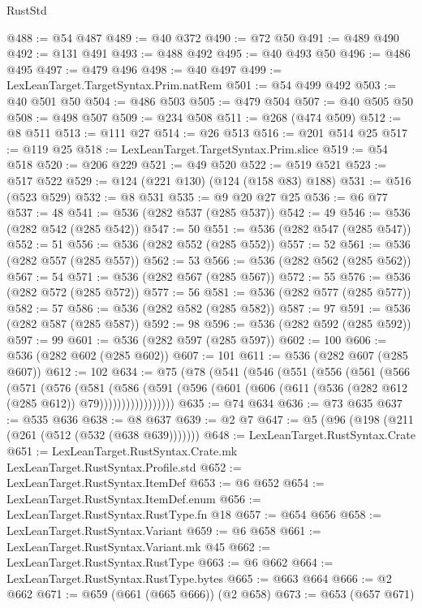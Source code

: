 \begin{lexlean}{RustStd}
\begin{coremodule}
@488 := @54 @487
@489 := @40 @372
@490 := @72 @50
@491 := @489 @490
@492 := @131 @491
@493 := @488 @492
@495 := @40 @493 @50
@496 := @486 @495
@497 := @479 @496
@498 := @40 @497
@499 := LexLeanTarget.TargetSyntax.Prim.natRem
@501 := @54 @499 @492
@503 := @40 @501 @50
@504 := @486 @503
@505 := @479 @504
@507 := @40 @505 @50
@508 := @498 @507
@509 := @234 @508
@511 := @268 (@474 @509)
@512 := @8 @511
@513 := @111 @27
@514 := @26 @513
@516 := @201 @514 @25
@517 := @119 @25
@518 := LexLeanTarget.TargetSyntax.Prim.slice
@519 := @54 @518
@520 := @206 @229
@521 := @49 @520
@522 := @519 @521
@523 := @517 @522
@529 := @124 (@221 @130) (@124 (@158 @83) @188)
@531 := @516 (@523 @529)
@532 := @8 @531
@535 := @9 @20 @27 @25
@536 := @6 @77
@537 := 48
@541 := @536 (@282 @537 (@285 @537))
@542 := 49
@546 := @536 (@282 @542 (@285 @542))
@547 := 50
@551 := @536 (@282 @547 (@285 @547))
@552 := 51
@556 := @536 (@282 @552 (@285 @552))
@557 := 52
@561 := @536 (@282 @557 (@285 @557))
@562 := 53
@566 := @536 (@282 @562 (@285 @562))
@567 := 54
@571 := @536 (@282 @567 (@285 @567))
@572 := 55
@576 := @536 (@282 @572 (@285 @572))
@577 := 56
@581 := @536 (@282 @577 (@285 @577))
@582 := 57
@586 := @536 (@282 @582 (@285 @582))
@587 := 97
@591 := @536 (@282 @587 (@285 @587))
@592 := 98
@596 := @536 (@282 @592 (@285 @592))
@597 := 99
@601 := @536 (@282 @597 (@285 @597))
@602 := 100
@606 := @536 (@282 @602 (@285 @602))
@607 := 101
@611 := @536 (@282 @607 (@285 @607))
@612 := 102
@634 := @75
    (@78
      (@541
        (@546
          (@551
            (@556
              (@561
                (@566
                  (@571
                    (@576
                      (@581
                        (@586
                          (@591
                            (@596
                              (@601 (@606 (@611 (@536 (@282 @612 (@285 @612)) @79)))))))))))))))))
@635 := @74 @634
@636 := @73 @635
@637 := @535 @636
@638 := @8 @637
@639 := @2 @7
@647 := @5 (@96 (@198 (@211 (@261 (@512 (@532 (@638 @639)))))))
@648 := LexLeanTarget.RustSyntax.Crate
@651 := LexLeanTarget.RustSyntax.Crate.mk LexLeanTarget.RustSyntax.Profile.std
@652 := LexLeanTarget.RustSyntax.ItemDef
@653 := @6 @652
@654 := LexLeanTarget.RustSyntax.ItemDef.enum
@656 := LexLeanTarget.RustSyntax.RustType.fn @18
@657 := @654 @656
@658 := LexLeanTarget.RustSyntax.Variant
@659 := @6 @658
@661 := LexLeanTarget.RustSyntax.Variant.mk @45
@662 := LexLeanTarget.RustSyntax.RustType
@663 := @6 @662
@664 := LexLeanTarget.RustSyntax.RustType.bytes
@665 := @663 @664
@666 := @2 @662
@671 := @659 (@661 (@665 @666)) (@2 @658)
@673 := @653 (@657 @671)

\end{coremodule}
\end{lexlean}
